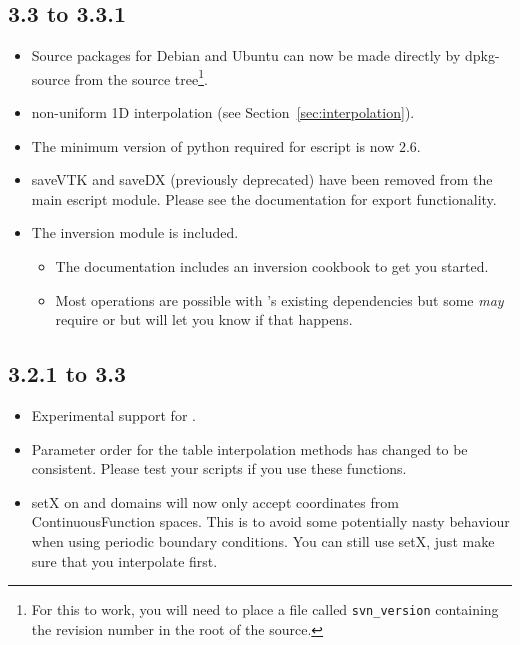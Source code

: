\subsection*{3.3 to 3.3.1}
\begin{itemize}
 \item Source packages for Debian and Ubuntu can now be made directly by dpkg-source from the source tree\footnote{For this to work, you will need to place a file called \texttt{svn_version} containing the revision number in the root of the source.}.
 \item non-uniform 1D interpolation (see Section~\ref{sec:interpolation}).
 \item The minimum version of python required for escript is now $2.6$.
 \item saveVTK and saveDX (previously deprecated) have been removed from the main escript module.
Please see the  documentation for export functionality.
 \item The  inversion module is included.
\begin{itemize}
 \item The documentation includes an inversion cookbook to get you started.
 \item Most operations are possible with \escript's existing dependencies but some \emph{may} require  or 
  but \escript will let you know if that happens.
\end{itemize}
 
\end{itemize}


\subsection*{3.2.1 to 3.3}
\begin{itemize}
 \item Experimental support for \pythonthree.
 \item Parameter order for the table interpolation methods has changed to be consistent. 
 Please test your scripts if you use these functions.
 \item setX on \finley and \dudley domains will now only accept coordinates from ContinuousFunction spaces.
 This is to avoid some potentially nasty behaviour when using periodic boundary conditions.
 You can still use setX, just make sure that you interpolate first.
\end{itemize}


